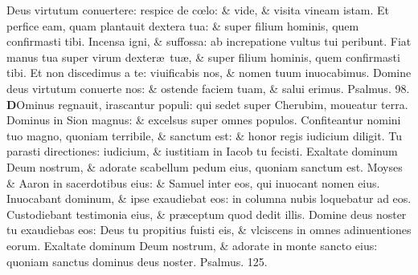 \documentclass[a5paper,10pt]{book}
\def\ae{æ}
\def\oe{œ}
\begin{document}
\begin{multicols*}{2}
\newline \color{red} D\color{black}eus virtutum conuertere: respice de c\oe lo: \& vide, \& visita vineam istam.
\newline \color{red} E\color{black}t perfice eam, quam plantauit dextera tua: \& super filium hominis, quem confirmasti tibi.
\newline \color{red} I\color{black}ncensa igni, \& suffossa: ab increpatione vultus tui peribunt.
\newline \color{red} F\color{black}iat manus tua super virum dexter\ae \ tu\ae , \& super filium hominis, quem confirmasti tibi.
\newline \color{red} E\color{black}t non discedimus a te: viuificabis nos, \& nomen tuum inuocabimus.
\newline \color{red} D\color{black}omine deus virtutum conuerte nos: \& ostende faciem tuam, \& salui erimus. \quad \color{red} Psalmus. \hypertarget{ps98}{98.} \color{black}
\vspace{-.5em}
\lettrine[lines=2]{\bfseries \color{red} D}{}Ominus regnauit, irascantur populi: qui sedet super Cherubim, moueatur terra.
\newline \color{red} D\color{black}ominus in Sion magnus: \& excelsus super omnes populos.
\newline \color{red} C\color{black}onfiteantur nomini tuo magno, quoniam terribile, \& sanctum est: \& honor regis iudicium diligit.
\newline \color{red} T\color{black}u parasti directiones: iudicium, \& iustitiam in Iacob tu fecisti.
\newline \color{red} E\color{black}xaltate dominum Deum nostrum, \& adorate scabellum pedum eius, quoniam sanctum est.
\newline \color{red} M\color{black}oyses \& Aaron in sacerdotibus eius: \& Samuel inter eos, qui inuocant nomen eius.
\newline \color{red} I\color{black}nuocabant dominum, \& ipse exaudiebat eos: in columna nubis loquebatur ad eos.
\newline \color{red} C\color{black}ustodiebant testimonia eius, \& pr\ae ceptum quod dedit illis.
\newline \color{red} D\color{black}omine deus noster tu exaudiebas eos: Deus tu propitius fuisti eis, \& vlciscens in omnes adinuentiones eorum.
\newline \color{red} E\color{black}xaltate dominum Deum nostrum, \& adorate in monte sancto eius: quoniam sanctus dominus deus noster. \quad \color{red} Psalmus. \hypertarget{ps125}{125.} \color{black}

\end{multicols*}
\end{document}
